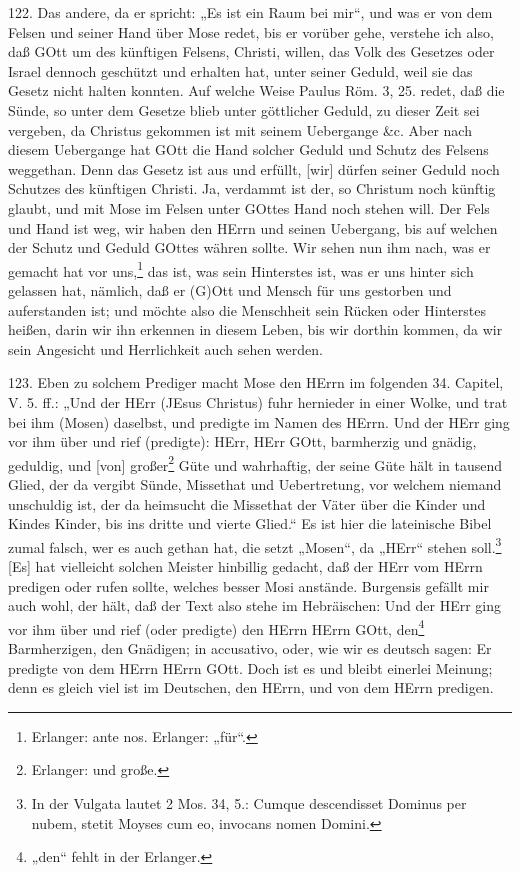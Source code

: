 122. Das andere, da er spricht: „Es ist ein Raum bei mir“, und was er von dem Felsen und seiner Hand über Mose redet, bis er vorüber gehe, verstehe ich also, daß GOtt um des künftigen Felsens, Christi, willen, das Volk des Gesetzes oder Israel dennoch geschützt und erhalten hat, unter seiner Geduld, weil sie das Gesetz nicht halten konnten. Auf welche Weise Paulus Röm. 3, 25. redet, daß die Sünde, so unter dem Gesetze blieb unter göttlicher Geduld, zu dieser Zeit sei vergeben, da Christus gekommen ist mit seinem Uebergange \&c. Aber nach diesem Uebergange hat GOtt die Hand solcher Geduld und Schutz des Felsens weggethan. Denn das Gesetz ist aus und erfüllt, [wir] dürfen seiner Geduld noch Schutzes des künftigen Christi. Ja, verdammt ist der, so Christum noch künftig glaubt, und mit Mose im Felsen unter GOttes Hand noch stehen will. Der Fels und Hand ist weg, wir haben den HErrn und seinen Uebergang, bis auf welchen der Schutz und Geduld GOttes währen sollte. Wir sehen
nun ihm nach, was er gemacht hat vor uns,\footnote{Erlanger: ante nos. Erlanger: „für“.} das ist, was sein Hinterstes ist, was er uns hinter sich gelassen hat, nämlich, daß er (G)Ott und Mensch für uns gestorben und auferstanden ist; und möchte also die Menschheit sein Rücken oder Hinterstes heißen, darin wir ihn erkennen in diesem Leben, bis wir dorthin kommen, da wir sein Angesicht und Herrlichkeit auch sehen werden.

123. Eben zu solchem Prediger macht Mose den HErrn im folgenden 34. Capitel, V. 5. ff.: „Und der HErr (JEsus Christus) fuhr hernieder in einer Wolke, und trat bei ihm (Mosen) daselbst, und predigte im Namen des HErrn. Und der HErr ging vor ihm über und rief (predigte): HErr, HErr GOtt, barmherzig und gnädig, geduldig, und [von] großer\footnote{Erlanger: und große.} Güte und wahrhaftig, der seine Güte hält in tausend Glied, der da vergibt Sünde, Missethat und Uebertretung, vor welchem niemand unschuldig ist, der da heimsucht die Missethat der Väter über die Kinder und Kindes Kinder, bis ins dritte und vierte Glied.“ Es ist hier die lateinische Bibel zumal falsch, wer es auch gethan hat, die setzt „Mosen“, da „HErr“ stehen soll.\footnote{In der Vulgata lautet 2 Mos. 34, 5.: Cumque descendisset Dominus per nubem, stetit Moyses cum eo, invocans nomen Domini.} [Es] hat vielleicht solchen Meister hinbillig gedacht, daß der HErr vom HErrn predigen oder rufen sollte, welches besser Mosi anstände. Burgensis gefällt mir auch wohl, der hält, daß der Text also stehe im Hebräischen: Und der HErr ging vor ihm über und rief (oder predigte) den HErrn HErrn GOtt, den\footnote{„den“ fehlt in der Erlanger.} Barmherzigen, den Gnädigen; in accusativo, oder, wie wir es deutsch sagen: Er predigte von dem HErrn HErrn GOtt. Doch ist es und bleibt einerlei Meinung; denn es gleich viel ist im Deutschen, den HErrn, und von dem HErrn predigen.


